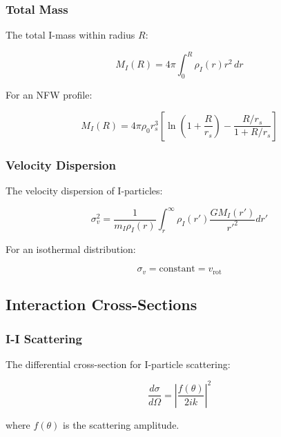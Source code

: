 \subsubsection{Total Mass}

The total I-mass within radius $R$:

\begin{equation}
\label{eq:enclosed_mass}
M_I(R) = 4\pi \int_0^R \rho_I(r) r^2 \, dr
\end{equation}

For an NFW profile:

\begin{equation}
\label{eq:nfw_mass}
M_I(R) = 4\pi\rho_0 r_s^3 \left[\ln\left(1 + \frac{R}{r_s}\right) - \frac{R/r_s}{1 + R/r_s}\right]
\end{equation}

\subsubsection{Velocity Dispersion}

The velocity dispersion of I-particles:

\begin{equation}
\label{eq:velocity_dispersion}
\sigma_v^2 = \frac{1}{m_I\rho_I(r)} \int_r^\infty \rho_I(r') \frac{GM_I(r')}{r'^2} dr'
\end{equation}

For an isothermal distribution:

\begin{equation}
\label{eq:isothermal_dispersion}
\sigma_v = \text{constant} = v_{\text{rot}}
\end{equation}

\subsection{Interaction Cross-Sections}

\subsubsection{I-I Scattering}

The differential cross-section for I-particle scattering:

\begin{equation}
\label{eq:i_i_scattering}
\frac{d\sigma}{d\Omega} = \left|\frac{f(\theta)}{2ik}\right|^2
\end{equation}

where $f(\theta)$ is the scattering amplitude.

